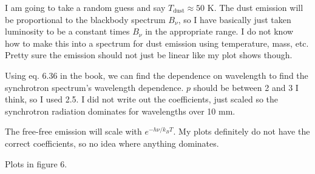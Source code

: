 \documentclass[10pt,letterpaper]{hmcpset}
\begin{document}
	\begin{solution}
		
		I am going to take a random guess and say $T_{\text{dust}} \approx 50 \text{ K}$. The dust emission will be proportional to the blackbody spectrum $B_\nu$, so I have basically just taken luminosity to be a constant times $B_\nu$ in the appropriate range. I do not know how to make this into a spectrum for dust emission using temperature, mass, etc. Pretty sure the emission should not just be linear like my plot shows though.
		
	\end{solution}

	\begin{problem}[Problem 2c]
	
	\end{problem}

	\begin{solution}
	
		Using eq. 6.36 in the book, we can find the dependence on wavelength to find the synchrotron spectrum's wavelength dependence. $p$ should be between 2 and 3 I think, so I used 2.5. I did not write out the coefficients, just scaled so the synchrotron radiation dominates for wavelengths over 10 mm.
	
	\end{solution}

	\begin{problem}[Problem 2d]
	
	\end{problem}
	
	\begin{solution}
		
		The free-free emission will scale with $e^{-h\nu/k_BT}$. My plots definitely do not have the correct coefficients, so no idea where anything dominates.
		
	\end{solution}

	\begin{problem}[Problem 3]
		
	\end{problem}
	
	\begin{solution}
		
		Plots in figure 6.
		
	\end{solution}
\end{document}
